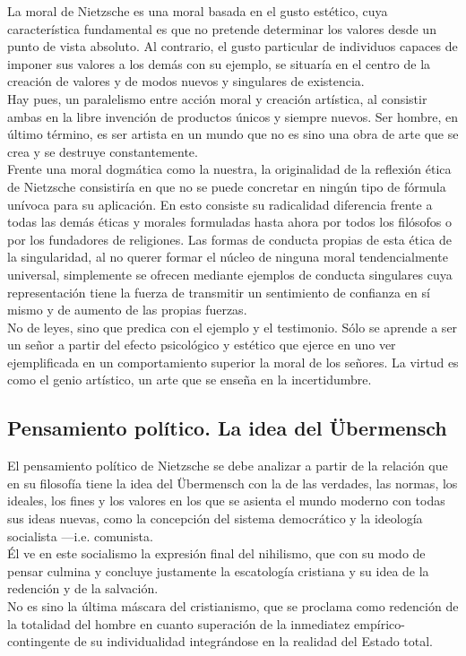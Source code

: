 \documentclass[a4paper, 10pt, twocolumn, spanish]{article}
\begin{document}
La moral de Nietzsche es una moral basada en el gusto estético, cuya
característica fundamental es que no pretende determinar los valores
desde un punto de vista absoluto. Al contrario, el gusto particular de
individuos capaces de imponer sus valores a los demás con su ejemplo,
se situaría en el centro de la creación de valores y de modos nuevos y
singulares de existencia.\\[0pt]
Hay pues, un paralelismo entre acción moral y creación artística, al
consistir ambas en la libre invención de productos únicos y siempre
nuevos. Ser hombre, en último término, es ser artista en un mundo que
no es sino una obra de arte que se crea y se destruye
constantemente.\\[0pt]
Frente una moral dogmática como la nuestra, la originalidad de la
reflexión ética de Nietzsche consistiría en que no se puede concretar
en ningún tipo de fórmula unívoca para su aplicación. En esto consiste
su radicalidad diferencia frente a todas las demás éticas y morales
formuladas hasta ahora por todos los filósofos o por los fundadores de
religiones. Las formas de conducta propias de esta ética de la
singularidad, al no querer formar el núcleo de ninguna moral
tendencialmente universal, simplemente se ofrecen mediante ejemplos de
conducta singulares cuya representación tiene la fuerza de transmitir
un sentimiento de confianza en sí mismo y de aumento de las propias
fuerzas.\\[0pt]
No de leyes, sino que predica con el ejemplo y el testimonio. Sólo se
aprende a ser un señor a partir del efecto psicológico y estético que
ejerce en uno ver ejemplificada en un comportamiento superior la moral
de los señores. La virtud es como el genio artístico, un arte que se
enseña en la incertidumbre.

\subsection{Pensamiento político. La idea del Übermensch}
\label{sec:org63767d9}

El pensamiento político de Nietzsche se debe analizar a partir de la
relación que en su filosofía tiene la idea del Übermensch con la de
las verdades, las normas, los ideales, los fines y los valores en los
que se asienta el mundo moderno con todas sus ideas nuevas, como la
concepción del sistema democrático y la ideología socialista
—i.e. comunista.\\[0pt]

Él ve en este socialismo la expresión final del nihilismo, que con su
modo de pensar culmina y concluye justamente la escatología cristiana
y su idea de la redención y de la salvación.\\[0pt]
No es sino la última máscara del cristianismo, que se proclama como
redención de la totalidad del hombre en cuanto superación de la
inmediatez empírico-contingente de su individualidad integrándose en
la realidad del Estado total.\\[0pt]
\end{document}
